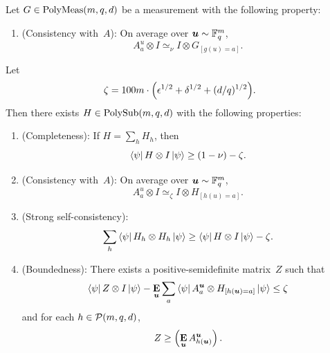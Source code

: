 \begin{lemma}\label{lem:self-improvement-helper}
Let $G \in \mathrm{PolyMeas}(m, q, d)$ be a measurement with the following property:
\begin{enumerate}

  \item (Consistency with~$A$): \label{item:self-improvement-G-consistency} On average over $\boldsymbol{u} \sim \mathbb F_q^{m}$,
	  \begin{equation*}
	  A^{u}_a \otimes I \simeq_{\nu} I \otimes G_{[g(u)=a]}.
	  \end{equation*}
	  \end{enumerate}
Let
\begin{equation*}
\zeta = 100m\cdot \Big(\epsilon^{1/2} + \delta^{1/2} + (d/q)^{1/2}\Big).
\end{equation*}
Then there exists $H \in \mathrm{PolySub}(m, q, d)$ with the following properties:
\begin{enumerate}
    \item(Completeness):  \label{item:self-improvement-completeness} If $H =  \sum_h H_h$, then
    \begin{equation*}
    \bra{\psi} H \otimes I \ket{\psi} \geq (1-\nu)-\zeta.
    \end{equation*}
    \item(Consistency with~$A$):\label{item:self-improvement-A-consistency} On average over $\boldsymbol{u} \sim \mathbb F_q^m$,
        \begin{equation*}
            A^u_a \otimes I \simeq_{\zeta} I \otimes H_{[h(u) = a]}.
        \end{equation*}
    \item(Strong self-consistency): \label{item:self-improvement-self}
    	\begin{equation*}
		\sum_{h} \bra{\psi} H_h \otimes H_h \ket{\psi} \geq \bra{\psi} H \otimes I \ket{\psi} - \zeta.
	\end{equation*}
    \item(Boundedness): \label{item:self-improvement-boundedness} There exists a positive-semidefinite matrix~$Z$ such that
    \begin{equation*}
        \bra{\psi} Z \otimes I \ket{\psi} -\mathop{\bf E\/}_{\boldsymbol{u}} \sum_a \bra{\psi}  A^{\boldsymbol{u}}_{a} \otimes H_{[h(\boldsymbol{u})=a]} \ket{\psi} \leq \zeta
    \end{equation*}
    and for each $h \in \mathcal{P}(m, q, d)$,
	\begin{equation*}
	Z \geq \left(\mathop{\bf E\/}_{\boldsymbol{u}} A^{\boldsymbol{u}}_{h(\boldsymbol{u})}\right).
	\end{equation*}
\end{enumerate}
\end{lemma}

